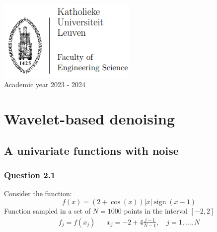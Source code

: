 \documentclass[a4paper]{article}
\DeclareMathOperator*{\sign}{sign}
\begin{document}
\begin{titlepage}
\begin{center}
			\includegraphics[width=0.5\textwidth]{Images/KUL_Eng_logo.png}\\
			{\Large{Academic year 2023 - 2024}}
			
		\end{center}
	\end{titlepage}
	
	\newpage
	
	\tableofcontents
	
	\newpage

    \section{Wavelet-based denoising}
 
	\subsection{A univariate functions with noise}

    \subsubsection{Question 2.1}

	Consider the function:
    \begin{equation*}
	f(x) = (2+\cos{(x)}) |x| \sign{(x-1)}
	\end{equation*}
    Function sampled in a set of $N=1000$ points in the interval $[-2,2]$
    \begin{align*}
    	f_j = f(x_j) && x_j = -2 + 4\frac{j-1}{N-1}, \quad j=1,\ldots,N
    \end{align*}
    
\end{document}
